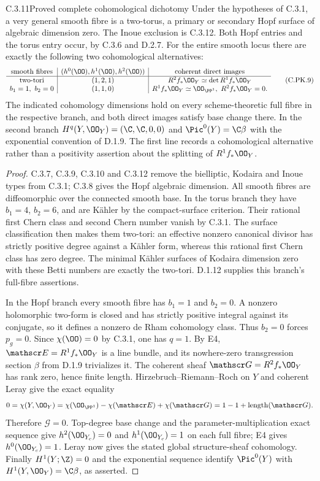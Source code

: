 \begin{idstatement}{C.3.11}{Proved complete cohomological dichotomy}
\label{st:C.3.11}
Under the hypotheses of C.3.1, a very general smooth fibre
is a two-torus, a primary or secondary Hopf surface of
algebraic dimension zero. The Inoue exclusion is C.3.12.
Both Hopf
entries and the torus entry occur, by C.3.6 and D.2.7.
For the entire smooth locus there are exactly the following
two cohomological alternatives:
\[
\begin{array}{c|c|c}
\text{smooth fibres}&
 (h^0(\OO),h^1(\OO),h^2(\OO))&
 \text{coherent direct images}\\ \hline
\text{two-tori}&(1,2,1)&
 R^2f_*\OO_Y\simeq\det R^1f_*\OO_Y\\
b_1=1,\ b_2=0&(1,1,0)&
 R^1f_*\OO_Y\simeq\OO_{\PP^1},\
 R^2f_*\OO_Y=0 .
\end{array}
\tag{C.PK.9}
\]
The indicated cohomology dimensions hold on every
scheme-theoretic full fibre in the respective branch,
and both direct images satisfy base change there.
In the second branch
$H^q(Y,\OO_Y)=(\C,\C,0,0)$ and
$\Pic^0(Y)=\C\beta$ with the exponential convention
of D.1.9. The first line records a cohomological
alternative rather than a positivity assertion about
the splitting of $R^1f_*\OO_Y$.
\end{idstatement}
\begin{proof}
C.3.7, C.3.9, C.3.10 and C.3.12 remove the bielliptic,
Kodaira and Inoue types from C.3.1; C.3.8 gives the Hopf algebraic
dimension. All smooth fibres are diffeomorphic over the
connected smooth base. In the torus branch they have
$b_1=4$, $b_2=6$, and are K\"ahler by the compact-surface
criterion. Their rational first Chern class and second
Chern number vanish by C.3.1. The surface classification
then makes them two-tori: an effective nonzero canonical
divisor has strictly positive degree against a K\"ahler
form, whereas this rational first Chern class has zero
degree. The minimal K\"ahler surfaces of Kodaira dimension
zero with these Betti numbers are exactly the two-tori.
D.1.12 supplies this branch's full-fibre assertions.

In the Hopf branch every smooth fibre has
$b_1=1$ and $b_2=0$. A nonzero holomorphic two-form
is closed and has strictly positive integral against
its conjugate, so it defines a nonzero de Rham
cohomology class. Thus $b_2=0$ forces $p_g=0$.
Since $\chi(\OO)=0$ by C.3.1, one has $q=1$.
By E4, $\mathscr E=R^1f_*\OO_Y$ is a line bundle,
and its nowhere-zero transgression section $\beta$
from D.1.9 trivializes it. The coherent sheaf
$\mathscr G=R^2f_*\OO_Y$ has rank zero, hence finite
length. Hirzebruch--Riemann--Roch on $Y$ and coherent
Leray give the exact equality
\[
 0=\chi(Y,\OO_Y)
   =\chi(\OO_{\PP^1})-\chi(\mathscr E)+\chi(\mathscr G)
   =1-1+\operatorname{length}(\mathscr G).
\]
Therefore $\mathscr G=0$. Top-degree base change and
the parameter-multiplication exact sequence give
$h^2(\OO_{Y_c})=0$ and $h^1(\OO_{Y_c})=1$ on each
full fibre; E4 gives $h^0(\OO_{Y_c})=1$.
Leray now gives the stated global structure-sheaf
cohomology. Finally $H^1(Y;\Z)=0$ and the exponential
sequence identify $\Pic^0(Y)$ with
$H^1(Y,\OO_Y)=\C\beta$, as asserted.
\end{proof}



